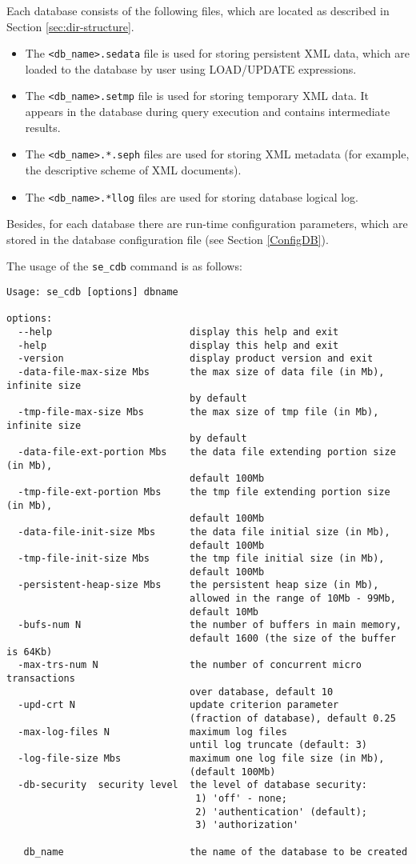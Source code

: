 \documentclass[a4paper,12pt]{article}
\begin{document}
Each database consists of the following files, which are located as described in Section \ref{sec:dir-structure}.

\begin{itemize}
\item The \verb!<db_name>.sedata! file is used for storing persistent XML data, which are loaded to the database by user using LOAD/UPDATE expressions.
\item The \verb!<db_name>.setmp! file is used for storing temporary XML data. It appears in the database during query execution and contains intermediate results.
\item The \verb!<db_name>.*.seph! files are used for storing XML metadata (for example, the descriptive scheme of XML documents).
\item The \verb!<db_name>.*llog! files are used for storing database logical log.
\end{itemize}

Besides, for each database there are run-time configuration parameters, which are stored in the database configuration file (see Section \ref{ConfigDB}).

The usage of the \verb!se_cdb! command is as follows:

\begin{verbatim}
Usage: se_cdb [options] dbname

options:
  --help		 				display this help and exit
  -help							display this help and exit
  -version						display product version and exit
  -data-file-max-size Mbs		the max size of data file (in Mb), infinite size
								by default
  -tmp-file-max-size Mbs		the max size of tmp file (in Mb), infinite size
								by default
  -data-file-ext-portion Mbs	the data file extending portion size (in Mb),
								default 100Mb
  -tmp-file-ext-portion Mbs		the tmp file extending portion size (in Mb),
								default 100Mb
  -data-file-init-size Mbs		the data file initial size (in Mb),
								default 100Mb
  -tmp-file-init-size Mbs		the tmp file initial size (in Mb),
								default 100Mb
  -persistent-heap-size Mbs		the persistent heap size (in Mb),
								allowed in the range of 10Mb - 99Mb,
								default 10Mb
  -bufs-num N					the number of buffers in main memory,
								default 1600 (the size of the buffer is 64Kb)
  -max-trs-num N				the number of concurrent micro transactions
								over database, default 10
  -upd-crt N					update criterion parameter
								(fraction of database), default 0.25
  -max-log-files N              maximum log files
                                until log truncate (default: 3)
  -log-file-size Mbs            maximum one log file size (in Mb),
                                (default 100Mb)
  -db-security  security level  the level of database security:
								 1) 'off' - none;
								 2) 'authentication' (default);
								 3) 'authorization'

   db_name   					the name of the database to be created
\end{verbatim}
\end{document}
